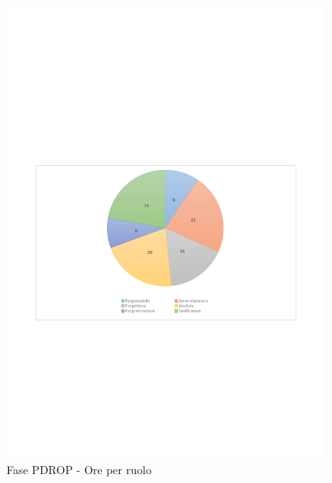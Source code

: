 \documentclass[../PianoProgetto.tex]{subfiles}
\begin{document}
	\begin{figure}[H]
		\centering
		\includegraphics[width=0.93\textwidth , trim=1.5cm 9cm 1.5cm 9cm]{grafici/PDROP/PDROP-ore-ruolo}
			\caption{Fase PDROP - Ore per ruolo}
		\label{fig:CircleChart-fasePDROP_ore_r}
	\end{figure}
\vfill
\end{document}
